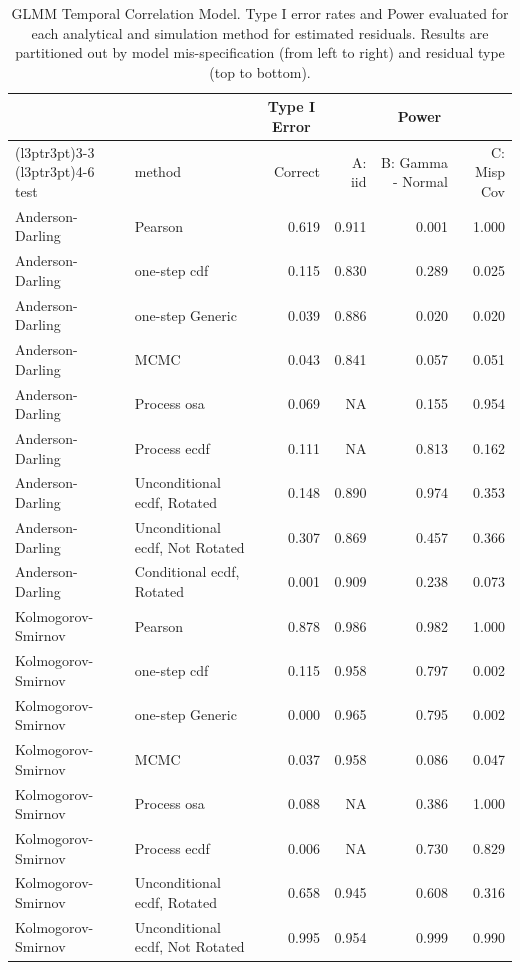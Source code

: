 \documentclass[
]{article}
\begin{document}
\begin{table}[H]
\centering
\caption{\label{tab:randomwalk-results-glmm-est}GLMM Temporal Correlation Model. Type I error rates and Power evaluated for each analytical and simulation method for estimated residuals. Results are partitioned out by model mis-specification (from left to right) and residual type (top to bottom).}
\centering
\begin{tabular}[t]{llrrrr}
\toprule
\multicolumn{1}{c}{ } & \multicolumn{1}{c}{ } & \multicolumn{1}{c}{Type I Error} & \multicolumn{3}{c}{Power} \\
\cmidrule(l{3pt}r{3pt}){3-3} \cmidrule(l{3pt}r{3pt}){4-6}
test & method & Correct & A: iid & B: Gamma - Normal & C: Misp Cov\\
\midrule
Anderson-Darling & Pearson & 0.619 & 0.911 & 0.001 & 1.000\\
Anderson-Darling & one-step cdf & 0.115 & 0.830 & 0.289 & 0.025\\
Anderson-Darling & one-step Generic & 0.039 & 0.886 & 0.020 & 0.020\\
Anderson-Darling & MCMC & 0.043 & 0.841 & 0.057 & 0.051\\
Anderson-Darling & Process osa & 0.069 & NA & 0.155 & 0.954\\
\addlinespace
Anderson-Darling & Process ecdf & 0.111 & NA & 0.813 & 0.162\\
Anderson-Darling & Unconditional ecdf, Rotated & 0.148 & 0.890 & 0.974 & 0.353\\
Anderson-Darling & Unconditional ecdf, Not Rotated & 0.307 & 0.869 & 0.457 & 0.366\\
Anderson-Darling & Conditional ecdf, Rotated & 0.001 & 0.909 & 0.238 & 0.073\\
Kolmogorov- Smirnov & Pearson & 0.878 & 0.986 & 0.982 & 1.000\\
\addlinespace
Kolmogorov- Smirnov & one-step cdf & 0.115 & 0.958 & 0.797 & 0.002\\
Kolmogorov- Smirnov & one-step Generic & 0.000 & 0.965 & 0.795 & 0.002\\
Kolmogorov- Smirnov & MCMC & 0.037 & 0.958 & 0.086 & 0.047\\
Kolmogorov- Smirnov & Process osa & 0.088 & NA & 0.386 & 1.000\\
Kolmogorov- Smirnov & Process ecdf & 0.006 & NA & 0.730 & 0.829\\
\addlinespace
Kolmogorov- Smirnov & Unconditional ecdf, Rotated & 0.658 & 0.945 & 0.608 & 0.316\\
Kolmogorov- Smirnov & Unconditional ecdf, Not Rotated & 0.995 & 0.954 & 0.999 & 0.990\\

\end{tabular}
\end{table}
\end{document}
